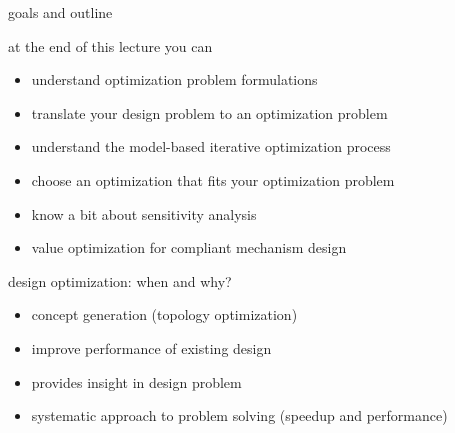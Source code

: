\documentclass[aspectratio=169]{beamer}
\begin{document}
\begin{frame}{goals and outline}



\centering
\begin{minipage}[c]{.8\textwidth}
at the end of this lecture you can

\begin{itemize}[itemsep=1.5em]
\pause
    \item[\checkmark] understand optimization problem formulations \pause
    \item[\checkmark] translate your design problem to an optimization problem \pause
    \item[\checkmark] understand the model-based iterative optimization process \pause
    \item[\checkmark] choose an optimization that fits your optimization problem\pause 
    \item[\checkmark] know a bit about sensitivity analysis
    \pause
    \item[\checkmark] value optimization for compliant mechanism design
\end{itemize}
\end{minipage}
\vfill
\centering

\end{frame}

\begin{frame}{design optimization: when and why?}



\centering
\begin{minipage}[c]{.7\textwidth}
\begin{itemize}[itemsep=1.5em]
\pause
\item[\checkmark] concept generation (topology optimization)
\pause
\item[\checkmark] improve performance of existing design
\pause
\item[\checkmark] provides insight in design problem
\pause
\item[\checkmark] systematic approach to problem solving (speedup and performance)
\end{itemize}
\end{minipage}
\end{frame}
\end{document}
